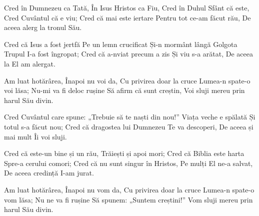 \beginverse
Cred în Dumnezeu ca Tată,
În Isus Hristos ca Fiu,
Cred în Duhul Sfânt că este,
Cred Cuvântul că e viu;
Cred că mai este iertare
Pentru tot ce-am făcut rău,
De aceea alerg la tronul Său.
\endverse

\beginverse
Cred că Isus a fost jertfă
Pe un lemn crucificat
Și-n mormânt lângă Golgota
Trupul I-a fost îngropat;
Cred că a-nviat precum a zis
Și viu s-a arătat,
De aceea la El am alergat.
\endverse

\beginchorus
Am luat hotărârea,
Înapoi nu voi da,
Cu privirea doar la cruce
Lumea-n spate-o voi lăsa;
Nu-mi va fi deloc rușine
Să afirm că sunt creștin,
Voi sluji mereu prin harul Său divin.
\endchorus

\beginverse
Cred Cuvântul care spune:
„Trebuie să te naști din nou!”
Viața veche e spălată
Și totul s-a făcut nou;
Cred că dragostea lui Dumnezeu
Te va descoperi,
De aceea și mai mult Îi voi sluji.
\endverse

\beginverse
Cred că este-un bine și un rău,
Trăiești și apoi mori;
Cred că Biblia este harta
Spre-a cerului comori;
Cred că nu sunt singur în Hristos,
Pe mulți El ne-a salvat,
De aceea credință I-am jurat.
\endverse

\beginchorus
Am luat hotărârea,
Înapoi nu vom da,
Cu privirea doar la cruce
Lumea-n spate-o vom lăsa;
Nu ne va fi rușine
Să spunem: „Suntem creștini!”
Vom sluji mereu prin harul Său divin.
\endchorus
\endsong
